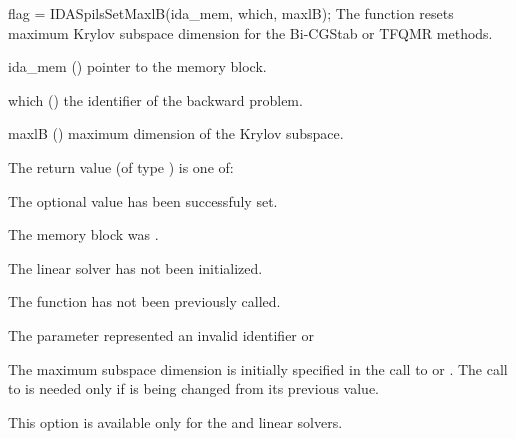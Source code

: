 {
  flag = IDASpilsSetMaxlB(ida\_mem, which, maxlB);
}
{
  The function  resets maximum Krylov subspace
  dimension for the Bi-CGStab or TFQMR 
  methods.
}
{
  \begin{args}
  \item[ida\_mem] ()
    pointer to the {\idas} memory block.
  \item[which] ()
    the identifier of the backward problem.
  \item[maxlB] ()
    maximum dimension of the Krylov subspace.
  \end{args}
}
{
  The return value  (of type ) is one of:
  \begin{args}
  \item[\Id{IDASPILS\_SUCCESS}] 
    The optional value has been successfuly set.
  \item[\Id{IDASPILS\_MEM\_NULL}]
    The  memory block was .
  \item[\Id{IDASPILS\_LMEM\_NULL}]
    The {\idaspgmr} linear solver has not been initialized.
  \item[\Id{IDASPILS\_NO\_ADJ}]
    The function  has not been previously called.
  \item[\Id{IDASPILS\_ILL\_INPUT}]
    The parameter  represented an invalid identifier or 
  \end{args}
}
{
  The maximum subspace dimension is initially specified in the call
  to  or .
  The call to  is needed only if  is being changed from its 
  previous value.

  {\warn}This option is available only for the {\idaspbcg} and {\idasptfqmr} linear solvers.

}
